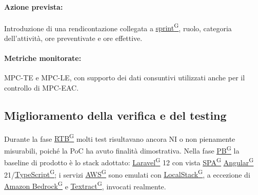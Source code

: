\documentclass[a4paper,12pt]{article}
\providecommand{\glslink}[2]{\href{https://alittlebyte-19.github.io/Documentazione/glossario.html\#gls-#1}{\underline{#2}\textsuperscript{\scriptsize G}}}
\begin{document}
\paragraph*{Azione prevista:} Introduzione di una rendicontazione collegata a \glslink{sprint}{sprint}, ruolo, categoria dell'attività, ore preventivate e ore effettive.

\paragraph*{Metriche monitorate:} MPC-TE e MPC-LE, con supporto dei dati consuntivi utilizzati anche per il controllo di MPC-EAC.

\subsection{Miglioramento della verifica e del testing}

Durante la fase \glslink{rtb-requirements-and-technology-baseline}{RTB} molti test risultavano ancora NI o non pienamente misurabili, poiché la PoC ha avuto finalità dimostrativa. Nella fase \glslink{pb-product-baseline}{PB} la baseline di prodotto è lo stack adottato: \glslink{laravel}{Laravel} 12 con vista \glslink{spa-single-page-application}{SPA} \glslink{angular}{Angular} 21/\glslink{typescript}{TypeScript}; i servizi \glslink{aws}{AWS} sono emulati con \glslink{localstack}{LocalStack}, a eccezione di \glslink{amazon-bedrock}{Amazon Bedrock} e \glslink{textract}{Textract}, invocati realmente.
\end{document}
